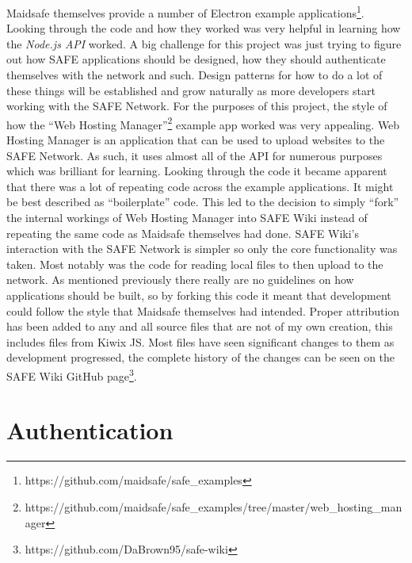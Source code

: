 Maidsafe themselves provide a number of Electron example applications\footnote{https://github.com/maidsafe/safe\_examples}. Looking through the code and how they worked was very helpful in learning how the \textit{Node.js API} worked. A big challenge for this project was just trying to figure out how SAFE applications should be designed, how they should authenticate themselves with the network and such. Design patterns for how to do a lot of these things will be established and grow naturally as more developers start working with the SAFE Network. For the purposes of this project, the style of how the ``Web Hosting Manager''\footnote{https://github.com/maidsafe/safe\_examples/tree/master/web\_hosting\_manager} example app worked was very appealing. Web Hosting Manager is an application that can be used to upload websites to the SAFE Network. As such, it uses almost all of the API for numerous purposes which was brilliant for learning. Looking through the code it became apparent that there was a lot of repeating code across the example applications. It might be best described as ``boilerplate'' code. This led to the decision to simply ``fork'' the internal workings of Web Hosting Manager into SAFE Wiki instead of repeating the same code as Maidsafe themselves had done. SAFE Wiki's interaction with the SAFE Network is simpler so only the core functionality was taken. Most notably was the code for reading local files to then upload to the network. As mentioned previously there really are no guidelines on how applications should be built, so by forking this code it meant that development could follow the style that Maidsafe themselves had intended. Proper attribution has been added to any and all source files that are not of my own creation, this includes files from Kiwix JS. Most files have seen significant changes to them as development progressed, the complete history of the changes can be seen on the SAFE Wiki GitHub page\footnote{https://github.com/DaBrown95/safe-wiki}.

\section{Authentication}

